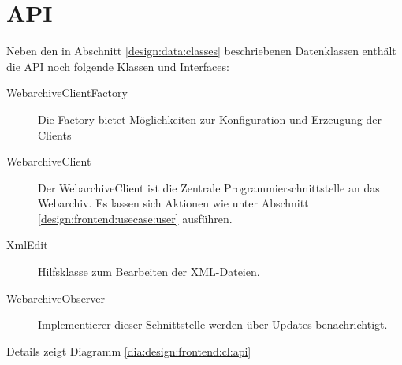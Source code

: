 \section{API}
Neben den in Abschnitt \ref{design:data:classes} beschriebenen Datenklassen enthält die
API noch folgende Klassen und Interfaces:
\begin{description}
	\item [WebarchiveClientFactory]
		Die Factory bietet Möglichkeiten zur Konfiguration und Erzeugung der Clients
	\item [WebarchiveClient]
		Der WebarchiveClient ist die Zentrale Programmierschnittstelle an das Webarchiv.
		Es lassen sich Aktionen wie unter Abschnitt \ref{design:frontend:usecase:user} ausführen.
	\item [XmlEdit]
		Hilfsklasse zum Bearbeiten der XML-Dateien.
	\item [WebarchiveObserver]
		Implementierer dieser Schnittstelle werden über Updates benachrichtigt.
\end{description}
Details zeigt Diagramm \ref{dia:design:frontend:cl:api}
